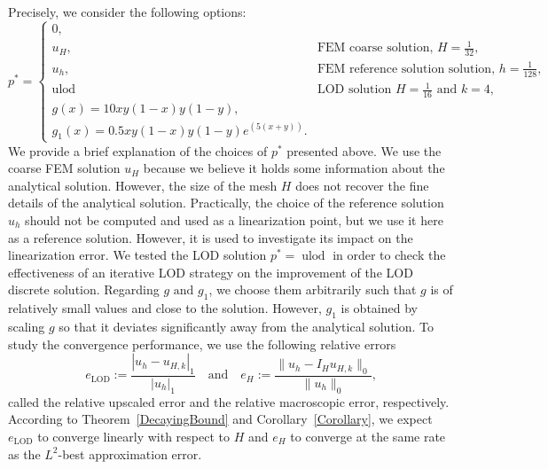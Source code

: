 \documentclass{article}
\begin{document}
 Precisely, we consider the following options: 
\[ p^* = 
\begin{cases}
    0 ,   \\
    u_H, & \text{FEM coarse solution, $H=\frac{1}{32}$,}   \\
    u_h, & \text{FEM reference solution solution, $h=\frac{1}{128}$,}\\
    \operatorname{ulod} & \text{LOD solution $H=\frac{1}{16}$ and $k=4$,}\\
    g(x)= 10x y (1 - x)  y  (1 - y),\\
    g_1(x)  =  0.5x y (1 - x)  y  (1 - y)e^{(5(x+y))}.
\end{cases} \]
We provide a brief explanation of the choices of $p^*$ presented above. We use the coarse FEM solution $u_H$ because we believe it holds some information about the analytical solution. However, the size of the mesh $H$ does not recover the fine details of the analytical solution. Practically, the choice of the reference solution $u_h$ should not be computed and used as a linearization point, but we use it here as a reference solution. However, it is used to investigate its impact on the linearization error. We tested the LOD solution $p^*=\operatorname{ulod}$ in order to check the effectiveness of an iterative LOD strategy on the improvement of the LOD discrete solution. Regarding $g \text{ and }g_1$, we choose them arbitrarily such that $g$ is of relatively small values and close to the solution. However, $g_1$ is obtained by scaling $g$ so that it deviates significantly away from the analytical solution. To study the convergence performance, we use the following relative errors
\[e_{\operatorname{LOD}}:= \frac{|u_h-u_{H,k}|_1}{|{u_h}|_1} \quad \text{and}\quad e_{H}:= \frac{\|{u_h-I_Hu_{H,k}}\|_0}{\|u_h\|_0},\]
called the relative upscaled error and the relative macroscopic error, respectively.
According to Theorem~\ref{DecayingBound} and Corollary~\ref{Corollary}, we expect $e_{\operatorname{LOD}}$ to converge linearly with respect to $H$ and $e_H$ to converge at the same rate as the $L^2$-best approximation error.
 
\end{document}
